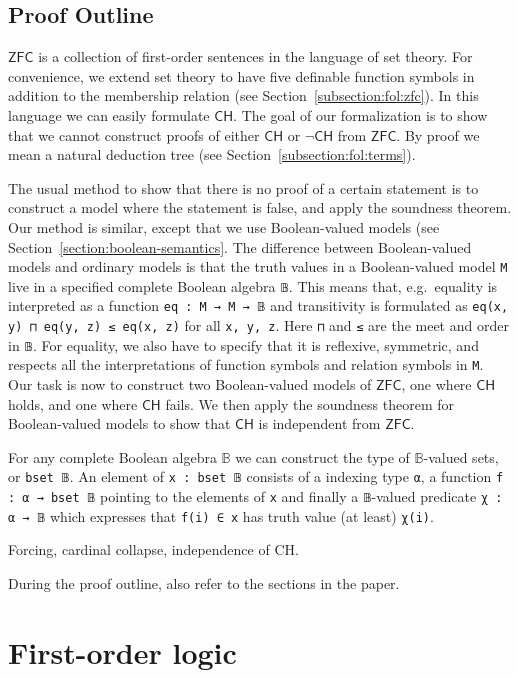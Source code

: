 \documentclass[sigplan,10pt,review, anonymous]{acmart}
\newcommand{\lil}{\lstinline}
\newcommand{\ZFC}{\mathsf{ZFC}}
\newcommand{\CH}{\mathsf{CH}}
\theoremstyle{definition}
\begin{document}
\subsection{Proof Outline}
\label{subsection:intro:outline}
$\ZFC$ is a collection of first-order sentences in the language of set theory. For convenience, we extend set theory to have five definable function symbols in addition to the membership relation (see Section~\ref{subsection:fol:zfc}).
In this language we can easily formulate $\CH$.
The goal of our formalization is to show that we cannot construct proofs of either $\CH$ or $\neg\CH$ from $\ZFC$.
By proof we mean a natural deduction tree (see Section~\ref{subsection:fol:terms}).

The usual method to show that there is no proof of a certain statement is to construct a model where the statement is false, and apply the soundness theorem.
Our method is similar, except that we use Boolean-valued models (see Section~\ref{section:boolean-semantics}.
The difference between Boolean-valued models and ordinary models is that the truth values in a Boolean-valued model \lil{M} live in a specified complete Boolean algebra \lil{𝔹}.
This means that, e.g.\ equality is interpreted as a function \lil{eq : M → M → 𝔹} and transitivity is formulated as \lil{eq(x, y) ⊓ eq(y, z) ≤ eq(x, z)} for all \lil{x, y, z}.
Here \lil{⊓} and \lil{≤} are the meet and order in \lil{𝔹}.
For equality, we also have to specify that it is reflexive, symmetric, and respects all the interpretations of function symbols and relation symbols in \lil{M}.
Our task is now to construct two Boolean-valued models of $\ZFC$, one where $\CH$ holds, and one where $\CH$ fails.
We then apply the soundness theorem for Boolean-valued models to show that $\CH$ is independent from $\ZFC$.

For any complete Boolean algebra $\mathbb{B}$ we can construct the type of $\mathbb{B}$-valued sets, or \lil{bset 𝔹}. 
An element of \lil{x : bset 𝔹} consists of a indexing type \lil{α}, a function \lil{f : α → bset 𝔹} pointing to the elements of \lil{x} and finally a \lil{𝔹}-valued predicate \lil{χ : α → 𝔹} which expresses that \lil{f(i) ∈ x} has truth value (at least) \lil{χ(i)}.

Forcing, cardinal collapse, independence of CH.

During the proof outline, also refer to the sections in the paper.
\section{First-order logic}
\label{section:fol}
\end{document}
